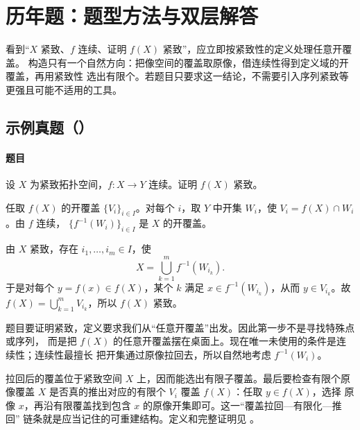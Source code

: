 \section{历年题：题型方法与双层解答}

\begin{methodbox}[title={题型：证明连续像紧致}]
看到“\(X\) 紧致、\(f\) 连续、证明 \(f(X)\) 紧致”，应立即按紧致性的定义处理任意开覆盖。
构造只有一个自然方向：把像空间的覆盖取原像，借连续性得到定义域的开覆盖，再用紧致性
选出有限个。若题目只要求这一结论，不需要引入序列紧致等更强且可能不适用的工具。
\end{methodbox}

\problemstart
\subsection{示例真题（）}

\paragraph{题目}
设 \(X\) 为紧致拓扑空间，\(f:X\to Y\) 连续。证明 \(f(X)\) 紧致。

\begin{examanswer}
任取 \(f(X)\) 的开覆盖 \(\{V_i\}_{i\in I}\)。对每个 \(i\)，取 \(Y\) 中开集
\(W_i\)，使 \(V_i=f(X)\cap W_i\)。由 \(f\) 连续，
\(\{f^{-1}(W_i)\}_{i\in I}\) 是 \(X\) 的开覆盖。

由 \(X\) 紧致，存在 \(i_1,\dots,i_m\in I\)，使
\[
  X=\bigcup_{k=1}^{m}f^{-1}(W_{i_k}).
\]
于是对每个 \(y=f(x)\in f(X)\)，某个 \(k\) 满足
\(x\in f^{-1}(W_{i_k})\)，从而 \(y\in V_{i_k}\)。故
\(f(X)=\bigcup_{k=1}^{m}V_{i_k}\)，所以 \(f(X)\) 紧致。
\end{examanswer}

\begin{idea}
题目要证明紧致，定义要求我们从“任意开覆盖”出发。因此第一步不是寻找特殊点或序列，
而是把 \(f(X)\) 的任意开覆盖摆在桌面上。现在唯一未使用的条件是连续性；连续性最擅长
把开集通过原像拉回去，所以自然地考虑 \(f^{-1}(W_i)\)。

拉回后的覆盖位于紧致空间 \(X\) 上，因而能选出有限子覆盖。最后要检查有限个原像覆盖
\(X\) 是否真的推出对应的有限个 \(V_i\) 覆盖 \(f(X)\)：任取 \(y\in f(X)\)，选择
原像 \(x\)，再沿有限覆盖找到包含 \(x\) 的原像开集即可。这一“覆盖拉回—有限化—推回”
链条就是应当记住的可重建结构。定义和完整证明见
。
\end{idea}
